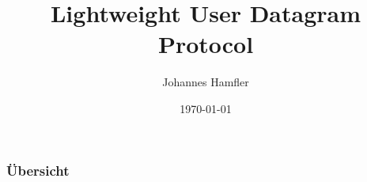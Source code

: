 \documentclass{beamer}
\title[UDP-Lite]{Lightweight User Datagram Protocol} %
\author{Johannes Hamfler} %
\institute[HfTL] %
{
Hochschule für Telekommunikation Leipzig \\ %
\medskip
\textit{johannes.hamfler@hftl.de} %
}
\date{\today} %
\begin{document}
\begin{frame}
\titlepage %
\end{frame}

\begin{frame}
\frametitle{Übersicht} %
\tableofcontents %
\end{frame}

\end{document}
